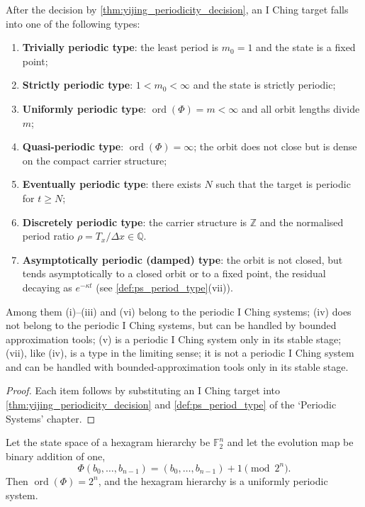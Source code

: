 \begin{corollary}\label{cor:yijing_period_type}
After the decision by \cref{thm:yijing_periodicity_decision}, an I Ching target falls into one of the following types:
\begin{enumerate}[label=(\roman*)]
    \item \textbf{Trivially periodic type}: the least period is $m_0=1$ and the state is a fixed point;
    \item \textbf{Strictly periodic type}: $1<m_0<\infty$ and the state is strictly periodic;
    \item \textbf{Uniformly periodic type}: $\operatorname{ord}(\Phi)=m<\infty$ and all orbit lengths divide $m$;
    \item \textbf{Quasi-periodic type}: $\operatorname{ord}(\Phi)=\infty$; the orbit does not close but is dense on the compact carrier structure;
    \item \textbf{Eventually periodic type}: there exists $N$ such that the target is periodic for $t\ge N$;
    \item \textbf{Discretely periodic type}: the carrier structure is $\mathbb Z$ and the normalised period ratio $\rho=T_x/\Delta x\in\mathbb Q$.
    \item \textbf{Asymptotically periodic (damped) type}: the orbit is not closed, but tends asymptotically to a closed orbit or to a fixed point, the residual decaying as $e^{-\kappa t}$ (see \cref{def:ps_period_type}(vii)).
\end{enumerate}
Among them (i)--(iii) and (vi) belong to the periodic I Ching systems; (iv) does not belong to the periodic I Ching systems, but can be handled by bounded approximation tools; (v) is a periodic I Ching system only in its stable stage; (vii), like (iv), is a type in the limiting sense; it is not a periodic I Ching system and can be handled with bounded-approximation tools only in its stable stage.
\end{corollary}

\begin{proof}
Each item follows by substituting an I Ching target into \cref{thm:yijing_periodicity_decision} and \cref{def:ps_period_type} of the `Periodic Systems' chapter.
\end{proof}

\begin{lemma}\label{lem:yijing_bagua_finite_order}
Let the state space of a hexagram hierarchy be $\mathbb F_2^n$ and let the evolution map be binary addition of one,
\[
\Phi(b_0,\dots,b_{n-1})=(b_0,\dots,b_{n-1})+1\pmod{2^n}.
\]
Then $\operatorname{ord}(\Phi)=2^n$, and the hexagram hierarchy is a uniformly periodic system.
\end{lemma}

